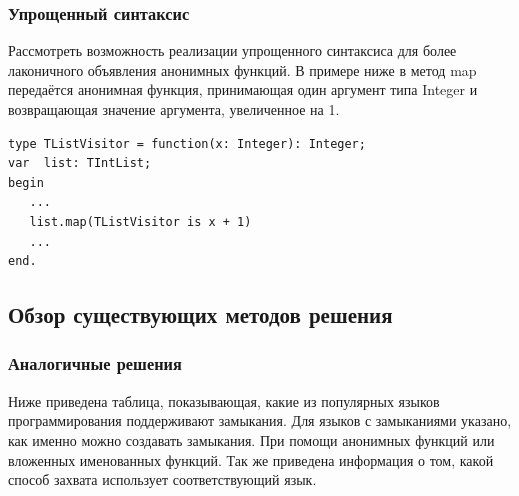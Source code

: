 \documentclass{imcs}
\begin{document}

\subsubsection{Упрощенный синтаксис}
Рассмотреть возможность реализации упрощенного синтаксиса для более лаконичного объявления
анонимных функций. В примере ниже в метод map передаётся анонимная функция, принимающая
один аргумент типа Integer и возвращающая значение аргумента, увеличенное на 1.
\begin{lstlisting}
type TListVisitor = function(x: Integer): Integer;
var  list: TIntList;
begin
   ...
   list.map(TListVisitor is x + 1)
   ...
end.
\end{lstlisting}

\subsection{Обзор существующих методов решения}

\subsubsection{Аналогичные решения}

Ниже приведена таблица, показывающая, какие из популярных языков программирования поддерживают
замыкания. Для языков с замыканиями указано, как именно можно создавать
замыкания. При помощи анонимных функций или вложенных именованных функций.
Так же приведена информация о том, какой способ захвата использует соответствующий язык.
\end{document}
